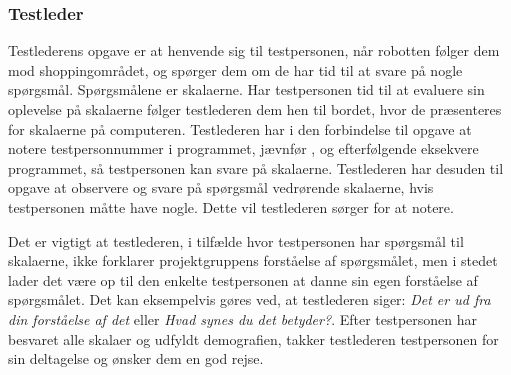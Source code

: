 \subsubsection*{Testleder}
%
Testlederens opgave er at henvende sig til testpersonen, når robotten følger dem mod shoppingområdet, og spørger dem om de har tid til at svare på nogle spørgsmål. Spørgsmålene er skalaerne. Har testpersonen tid til at evaluere sin oplevelse på skalaerne følger testlederen dem hen til bordet, hvor de præsenteres for skalaerne på computeren. Testlederen har i den forbindelse til opgave at notere testpersonnummer i programmet, jævnfør , og efterfølgende eksekvere programmet, så testpersonen kan svare på skalaerne. Testlederen har desuden til opgave at observere og svare på spørgsmål vedrørende skalaerne, hvis testpersonen måtte have nogle. Dette vil testlederen sørger for at notere. 

Det er vigtigt at testlederen, i tilfælde hvor testpersonen har spørgsmål til skalaerne, ikke forklarer projektgruppens forståelse af spørgsmålet, men i stedet lader det være op til den enkelte testpersonen at danne sin egen forståelse af spørgsmålet. Det kan eksempelvis gøres ved, at testlederen siger: \textit{Det er ud fra din forståelse af det} eller \textit{Hvad synes du det betyder?}. Efter testpersonen har besvaret alle skalaer og udfyldt demografien, takker testlederen testpersonen for sin deltagelse og ønsker dem en god rejse.
\newpage
 
